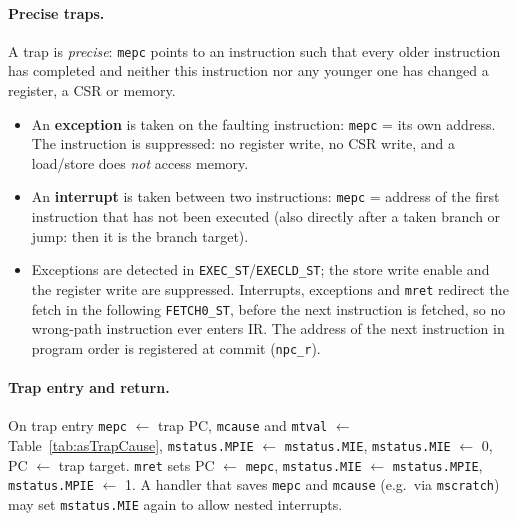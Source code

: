 \paragraph{Precise traps.}
A trap is \emph{precise}: \texttt{mepc} points to an instruction such that
every older instruction has completed and neither this instruction nor any
younger one has changed a register, a CSR or memory.
\begin{itemize}
  \item An \textbf{exception} is taken on the faulting instruction:
    \texttt{mepc} = its own address. The instruction is suppressed: no
    register write, no CSR write, and a load/store does \emph{not} access
    memory.
  \item An \textbf{interrupt} is taken between two instructions:
    \texttt{mepc} = address of the first instruction that has not been
    executed (also directly after a taken branch or jump: then it is the
    branch target).
  \item Exceptions are detected in
    \texttt{EXEC\_ST}/\texttt{EXECLD\_ST}; the store write enable and the
    register write are suppressed. Interrupts, exceptions and
    \texttt{mret} redirect the fetch in the following \texttt{FETCH0\_ST},
    before the next instruction is fetched, so no wrong-path instruction
    ever enters IR. The address of the next instruction in program order is
    registered at commit (\texttt{npc\_r}).
\end{itemize}

\paragraph{Trap entry and return.}
On trap entry \texttt{mepc} $\leftarrow$ trap PC, \texttt{mcause} and
\texttt{mtval} $\leftarrow$ Table~\ref{tab:asTrapCause},
\texttt{mstatus.MPIE} $\leftarrow$ \texttt{mstatus.MIE},
\texttt{mstatus.MIE} $\leftarrow$ 0, PC $\leftarrow$ trap target.
\texttt{mret} sets PC $\leftarrow$ \texttt{mepc},
\texttt{mstatus.MIE} $\leftarrow$ \texttt{mstatus.MPIE},
\texttt{mstatus.MPIE} $\leftarrow$ 1. A handler that saves \texttt{mepc}
and \texttt{mcause} (e.g.\ via \texttt{mscratch}) may set
\texttt{mstatus.MIE} again to allow nested interrupts.

